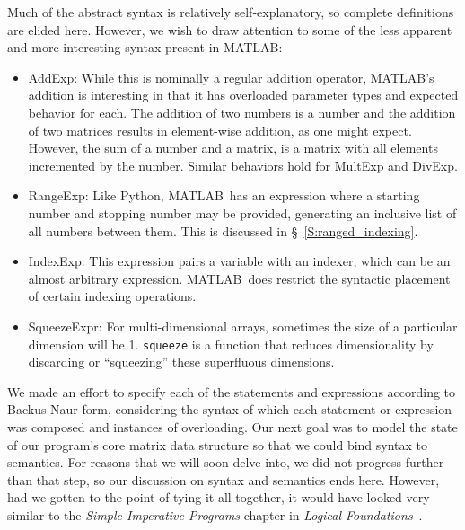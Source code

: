 \documentclass[11pt,conference]{IEEEtran}
\newcommand{\matlab}{MATLAB}
\newcommand{\mmatlab}{\textmu\matlab}
\theoremstyle{plain} %
\theoremstyle{definition}
\theoremstyle{remark}
\begin{document}
Much of the abstract syntax is relatively self-explanatory, so complete
definitions are elided here. However, we wish to draw attention to some of the
less apparent and more interesting syntax present in \mmatlab:

\begin{itemize}

    \item \textsf{AddExp}: While this is nominally a regular addition operator,
        \matlab's addition is interesting in that it has overloaded parameter
        types and expected behavior for each. The addition of two numbers is a
        number and the addition of two matrices results in element-wise
        addition, as one might expect. However, the sum of a number and a
        matrix, is a matrix with all elements incremented by the number. Similar
        behaviors hold for \textsf{MultExp} and \textsf{DivExp}.

    \item \textsf{RangeExp}: Like Python, \matlab\ has an expression where a
        starting number and stopping number may be provided, generating an
        inclusive list of all numbers between them. This is discussed in
        \S~\ref{S:ranged_indexing}.

    \item \textsf{IndexExp}: This expression pairs a variable with an indexer,
        which can be an almost arbitrary expression. \matlab\ does restrict the
        syntactic placement of certain indexing operations.

    \item \textsf{SqueezeExpr}: For multi-dimensional arrays, sometimes the size
        of a particular dimension will be 1. \texttt{squeeze} is a function that
        reduces dimensionality by discarding or ``squeezing'' these superfluous
        dimensions.

\end{itemize}

We made an effort to specify each of the statements and expressions according to
Backus-Naur form, considering the syntax of which each statement or expression
was composed and instances of overloading. Our next goal was to model the state
of our program's core matrix data structure so that we could bind syntax to
semantics. For reasons that we will soon delve into, we did not progress further
than that step, so our discussion on syntax and semantics ends here. However,
had we gotten to the point of tying it all together, it would have looked very
similar to the \textit{Simple Imperative Programs} chapter in \textit{Logical
Foundations}~\cite{Pierce:SF1}.
\end{document}

